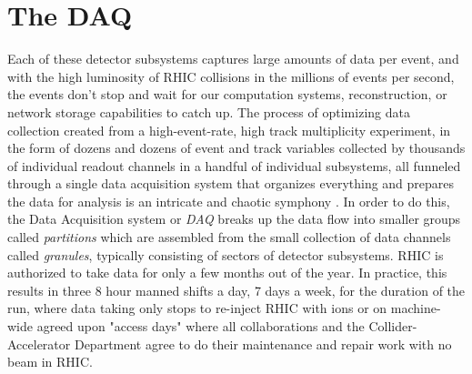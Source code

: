 \section{The DAQ}
Each of these detector subsystems captures large amounts of data per event, and with the high luminosity of RHIC collisions in the millions of events per second, the events don't stop and wait for our computation systems, reconstruction, or network storage capabilities to catch up. The process of optimizing data collection created from a high-event-rate, high track multiplicity experiment, in the form of dozens and dozens of event and track variables collected by thousands of individual readout channels in a handful of individual subsystems, all funneled through a single data acquisition system that organizes everything and prepares the data for analysis is an intricate and chaotic symphony \citep{DAQfocus}. In order to do this, the Data Acquisition system or \textit{DAQ} breaks up the data flow into smaller groups called \textit{partitions} which are assembled from the small collection of data channels called \textit{granules}, typically consisting of sectors of detector subsystems. RHIC is authorized to take data for only a few months out of the year. In practice, this results in three 8 hour manned shifts a day, 7 days a week, for the duration of the run, where data taking only stops to re-inject RHIC with ions or on machine-wide agreed upon "access days" where all collaborations and the Collider-Accelerator Department agree to do their maintenance and repair work with no beam in RHIC.

